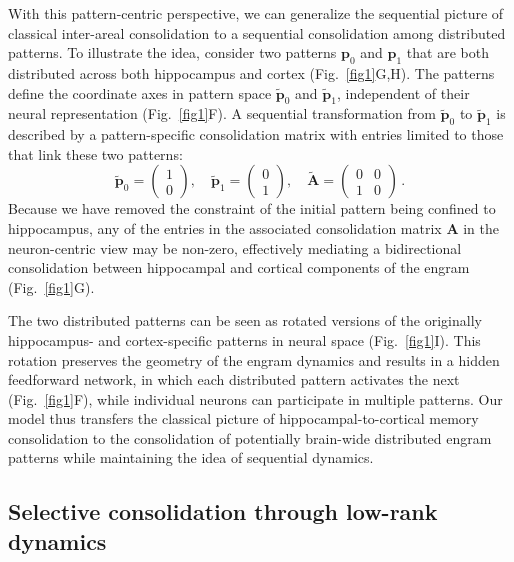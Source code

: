 With this pattern-centric perspective, we can generalize the sequential picture of classical inter-areal consolidation to a sequential consolidation among distributed patterns. To illustrate the idea, consider two patterns $\mathbf{p}_0$ and $\mathbf{p}_1$ that are both distributed across both hippocampus and cortex (Fig.~\ref{fig1}G,H). The patterns define the coordinate axes in pattern space $\tilde{\mathbf{p}}_0$ and $\tilde{\mathbf{p}}_1$, independent of their neural representation (Fig.~\ref{fig1}F). A sequential transformation from $\tilde{\mathbf{p}}_0$ to $\tilde{\mathbf{p}}_1$ is described by a pattern-specific consolidation matrix with entries limited to those that link these two patterns:
\begin{equation}
    \tilde{\mathbf{p}}_0 = \left(\begin{array}{c} 1 \\ 0 \end{array}\right), \quad
    \tilde{\mathbf{p}}_1 = \left(\begin{array}{c} 0 \\ 1 \end{array}\right), \quad
    \tilde{\mathbf{A}} = \left( \begin{array}{cc}
        0 & 0 \\
        1 & 0
    \end{array}\right) \,.
\end{equation}
Because we have removed the constraint of the initial pattern being confined to hippocampus, any of the entries in the associated consolidation matrix $\mathbf{A}$ in the neuron-centric view may be non-zero, effectively mediating a bidirectional consolidation between hippocampal and cortical components of the engram (Fig.~\ref{fig1}G).

The two distributed patterns can be seen as rotated versions of the originally hippocampus- and cortex-specific patterns in neural space (Fig.~\ref{fig1}I). This rotation preserves the geometry of the engram dynamics and results in a hidden feedforward network, in which each distributed pattern activates the next (Fig.~\ref{fig1}F), while individual neurons can participate in multiple patterns. Our model thus transfers the classical picture of hippocampal-to-cortical memory consolidation to the consolidation of potentially brain-wide distributed engram patterns while maintaining the idea of sequential dynamics.

\subsection{Selective consolidation through low-rank dynamics}

